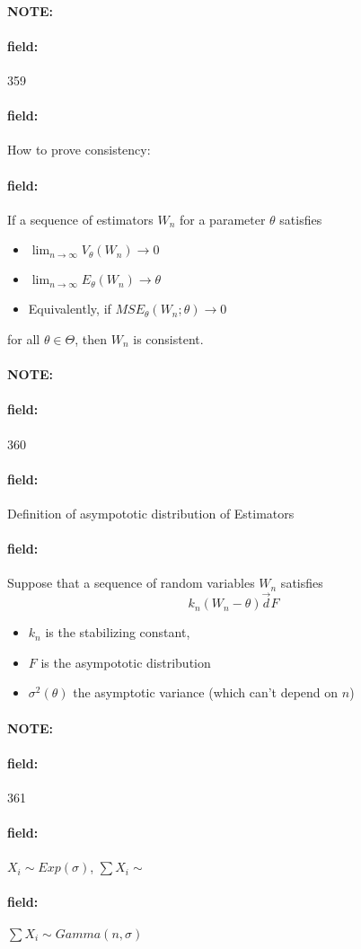 \documentclass[12pt]{article}
\newenvironment{note}{\paragraph{NOTE:}}{}
\newenvironment{field}{\paragraph{field:}}{}
\begin{document}
\begin{note}
    \begin{field}
        \tiny 359
    \end{field}
    \begin{field}
        How to prove consistency:
    \end{field}
    \begin{field}
      If a sequence of estimators $W_n$ for a parameter $\theta$ satisfies
      \begin{itemize}
        \item $\lim_{n\to\infty} V_\theta(W_n) \to 0$
        \item $\lim_{n\to\infty} E_{\theta}(W_n) \to \theta$
        \item Equivalently, if $MSE_\theta(W_n;\theta) \to 0$
      \end{itemize}
      for all $\theta \in \Theta$, then $W_n$ is consistent.
    \end{field}
\end{note}

\begin{note}
    \begin{field}
        \tiny 360
    \end{field}
    \begin{field}
        Definition of asympototic distribution of Estimators
    \end{field}
    \begin{field}
        Suppose that a sequence of random variables $W_n$ satisfies
        $$k_n(W_n - \theta) \overset{\to}{d} F $$
        \begin{itemize}
          \item $k_n$ is the stabilizing constant,
          \item $F$ is the asympototic distribution
          \item $\sigma^2(\theta)$ the asymptotic variance (which can't depend on $n$)
        \end{itemize}
    \end{field}
\end{note}

\begin{note}
    \begin{field}
        \tiny 361
    \end{field}
    \begin{field}
        $X_i \sim Exp(\sigma)$, $\sum X_i \sim $
    \end{field}
    \begin{field}
        $\sum X_i \sim Gamma(n,\sigma)$
    \end{field}
\end{note}
\end{document}
